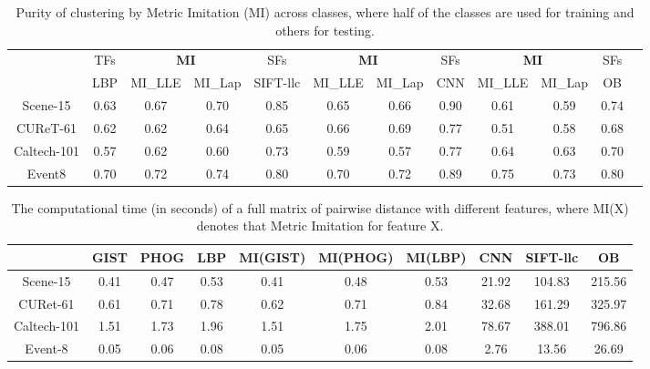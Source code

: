 \documentclass[10pt,twocolumn,letterpaper]{article}
\begin{document}
\begin{table}[!tb]
  \centering \small  \setlength{\tabcolsep}{.60em} 
  \caption{Purity of clustering by Metric Imitation (MI) across classes, where half of the classes are used for training and others for testing.}
  \begin{tabular}{c|c|ccc|ccc|cccc}
   & TFs & \multicolumn{2}{c}{\textbf{MI}} & SFs & \multicolumn{2}{c}{ \textbf{MI} } & SFs & \multicolumn{2}{c}{ \textbf{MI}} & SFs  \\   
    & LBP & MI\_LLE & MI\_Lap & SIFT-llc  & MI\_LLE & MI\_Lap & CNN &  MI\_LLE & MI\_Lap & OB     \\   \hline
     Scene-15    & 0.63  & 0.67  & 0.70  & 0.85  & 0.65  & 0.66  & 0.90    & 0.61  & 0.59  & 0.74 \\ 
    CUReT-61 & 0.62  & 0.62  & 0.64  & 0.65   & 0.66  & 0.69  & 0.77   & 0.51  & 0.58  & 0.68 \\ 
    Caltech-101 & 0.57  & 0.62  & 0.60  & 0.73  & 0.59  & 0.57  & 0.77     & 0.64  &0.63 &  0.70   \\ 
    Event8 & 0.70  & 0.72  & 0.74  & 0.80   & 0.70  & 0.72  & 0.89    & 0.75  & 0.73  & 0.80\\    \end{tabular}
  \label{tab:clustering:across}
\end{table}


\begin{table}[!tb]
  \centering \small  \setlength{\tabcolsep}{.60em} 
  \caption{The computational time (in seconds) of a full matrix of pairwise distance with different 
    features, where MI(X) denotes that Metric Imitation for feature X.   }
  \begin{tabular}{c|ccc|ccc|ccc}  
   & GIST   & PHOG &LBP &  \textbf{MI}(GIST) & \textbf{MI}(PHOG)   &  \textbf{MI}(LBP) &   CNN & SIFT-llc & OB \\ \hline
 Scene-15 & 0.41    & 0.47 & 0.53  & 0.41     & 0.48 & 0.53 & 21.92 & 104.83  & 215.56   \\
 CURet-61  & 0.61  & 0.71 & 0.78    & 0.62    & 0.71 & 0.84 & 32.68 & 161.29  & 325.97   \\ 
 Caltech-101 & 1.51  & 1.73 & 1.96  & 1.51    & 1.75 & 2.01  & 78.67  & 388.01  & 796.86 \\ 
 Event-8  & 0.05    & 0.06 & 0.08  & 0.05   & 0.06 & 0.08    & 2.76 & 13.56  & 26.69  \\ 
  \end{tabular}
  \label{tab:time}
\end{table}
\end{document}
